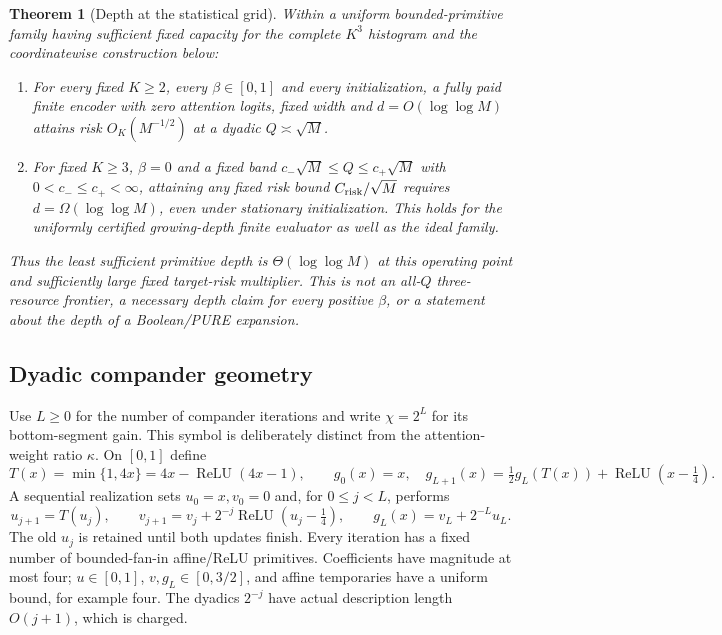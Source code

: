 \documentclass[11pt,letterpaper]{article}
\newtheorem{theorem}{Theorem}[section]
\theoremstyle{definition}\newtheorem{definition}[theorem]{Definition}
\theoremstyle{remark}\newtheorem{remark}[theorem]{Remark}
\begin{document}
\begin{theorem}[Depth at the statistical grid]\label{thm:depth}
Within a uniform bounded-primitive family having sufficient fixed capacity for the complete $K^3$ histogram and the coordinatewise construction below:
\begin{enumerate}
\item For every fixed $K\ge2$, every $\beta\in[0,1]$ and every initialization, a fully paid finite encoder with zero attention logits, fixed width and $d=O(\log\log M)$ attains risk $O_K(M^{-1/2})$ at a dyadic $Q\asymp\sqrt M$.
\item For fixed $K\ge3$, $\beta=0$ and a fixed band
$c_-\sqrt M\le Q\le c_+\sqrt M$ with $0<c_-\le c_+<\infty$, attaining any fixed risk bound $C_{\rm risk}/\sqrt M$ requires $d=\Omega(\log\log M)$, even under stationary initialization. This holds for the uniformly certified growing-depth finite evaluator as well as the ideal family.
\end{enumerate}
Thus the least sufficient primitive depth is $\Theta(\log\log M)$ at this operating point and sufficiently large fixed target-risk multiplier. This is not an all-$Q$ three-resource frontier, a necessary depth claim for every positive $\beta$, or a statement about the depth of a Boolean/PURE expansion.
\end{theorem}

\subsection{Dyadic compander geometry}
Use $L\ge0$ for the number of compander iterations and write $\chi=2^L$ for its bottom-segment gain. This symbol is deliberately distinct from the attention-weight ratio $\kappa$. On $[0,1]$ define
\begin{equation}\label{eq:compander}
 T(x)=\min\{1,4x\}=4x-\operatorname{ReLU}(4x-1),\qquad
 g_0(x)=x,\quad
 g_{L+1}(x)=\tfrac12g_L(T(x))+\operatorname{ReLU}(x-\tfrac14).
\end{equation}
A sequential realization sets $u_0=x,v_0=0$ and, for $0\le j<L$, performs
\begin{equation}\label{eq:companderrails}
 u_{j+1}=T(u_j),\qquad
 v_{j+1}=v_j+2^{-j}\operatorname{ReLU}(u_j-\tfrac14),
 \qquad g_L(x)=v_L+2^{-L}u_L.
\end{equation}
The old $u_j$ is retained until both updates finish. Every iteration has a fixed number of bounded-fan-in affine/ReLU primitives. Coefficients have magnitude at most four; $u\in[0,1]$, $v,g_L\in[0,3/2]$, and affine temporaries have a uniform bound, for example four. The dyadics $2^{-j}$ have actual description length $O(j+1)$, which is charged.
\end{document}
